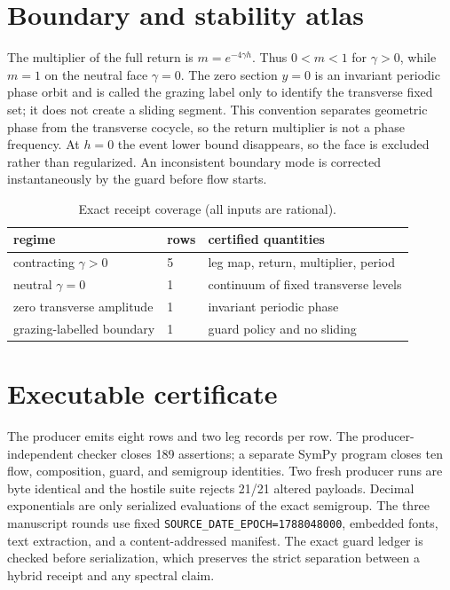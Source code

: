 \documentclass[10pt]{article}
\begin{document}
\section{Boundary and stability atlas}
The multiplier of the full return is $m=e^{-4\gamma h}$.  Thus
$0<m<1$ for $\gamma>0$, while $m=1$ on the neutral face $\gamma=0$.
The zero section $y=0$ is an invariant periodic phase orbit and is called
the grazing label only to identify the transverse fixed set; it does not
create a sliding segment.  This convention separates geometric phase from
the transverse cocycle, so the return multiplier is not a phase frequency.
At $h=0$ the event lower bound disappears, so the
face is excluded rather than regularized.  An inconsistent boundary mode is
corrected instantaneously by the guard before flow starts.

\begin{table}[htbp]
\centering\small
\caption{Exact receipt coverage (all inputs are rational).}
\begin{tabular}{lll}
\toprule
regime & rows & certified quantities\\
\midrule
contracting $\gamma>0$ & 5 & leg map, return, multiplier, period\\
neutral $\gamma=0$ & 1 & continuum of fixed transverse levels\\
zero transverse amplitude & 1 & invariant periodic phase\\
grazing-labelled boundary & 1 & guard policy and no sliding\\
\bottomrule
\end{tabular}
\end{table}

\section{Executable certificate}
The producer emits eight rows and two leg records per row.  The producer-
independent checker closes 189 assertions; a separate SymPy program closes ten
flow, composition, guard, and semigroup identities.  Two fresh producer runs
are byte identical and the hostile suite rejects 21/21 altered payloads.
Decimal exponentials are only serialized evaluations of the exact semigroup.
The three manuscript rounds use fixed \texttt{SOURCE\_DATE\_EPOCH=1788048000},
embedded fonts, text extraction, and a content-addressed manifest.
The exact guard ledger is checked before serialization, which preserves the
strict separation between a hybrid receipt and any spectral claim.
\end{document}
